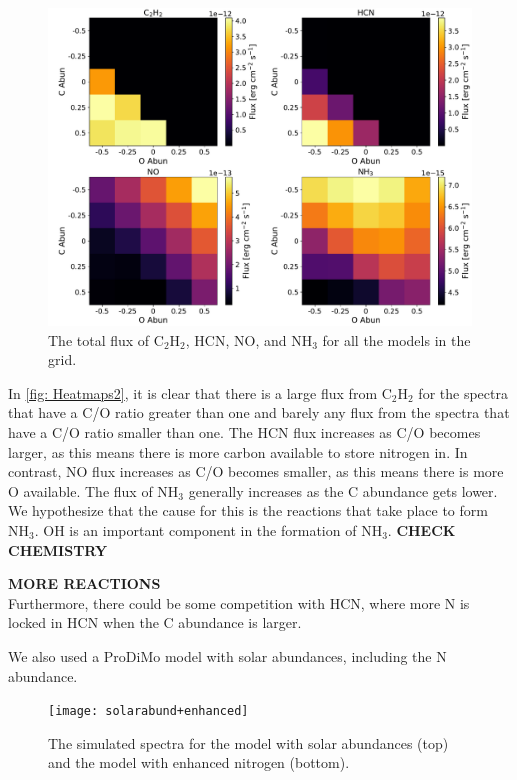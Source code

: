 \documentclass[oneside, single, authoryear, semicolon, 12pt]{lion-msc}
\newcommand{\4}{$_4$}
\newcommand{\3}{$_3$}
\newcommand{\2}{$_2$}
\begin{document}
\begin{figure}[H]
    \centering
    \includegraphics[width=\linewidth]{Figures/Heatmaps2.pdf}
    \caption{The total flux of C\2H\2, HCN, NO, and NH\3 for all the models in the grid.}
    \label{fig: Heatmaps2}
\end{figure}

In \autoref{fig: Heatmaps2}, it is clear that there is a large flux from C\2H\2 for the spectra that have a C/O ratio greater than one and barely any flux from the spectra that have a C/O ratio smaller than one. The HCN flux increases as C/O becomes larger, as this means there is more carbon available to store nitrogen in. In contrast, NO flux increases as C/O becomes smaller, as this means there is more O available. The flux of NH\3 generally increases as the C abundance gets lower. We hypothesize that the cause for this is the reactions that take place to form NH\3.
OH is an important component in the formation of NH\3. \textbf{CHECK CHEMISTRY}


\textbf{MORE REACTIONS}\\
Furthermore, there could be some competition with HCN, where more N is locked in HCN when the C abundance is larger. 

We also used a ProDiMo model with solar abundances, including the N abundance.

\begin{figure}
    \centering
    \texttt{[image: solarabund+enhanced]}
    \caption{The simulated spectra for the model with solar abundances (top) and the model with enhanced nitrogen (bottom). }
    \label{fig:enter-label}
\end{figure}
\end{document}
